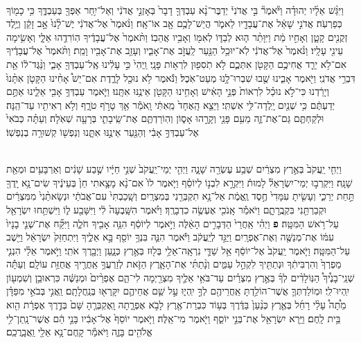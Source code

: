 \documentclass[twoside, openany, parskip=half, 11pt]{book}
\begin{document}
\begin{footnotesize}
\begin{multicols}{2}
\\
 וַיִּגַּ֨שׁ אֵלָ֜יו יְהוּדָ֗ה וַיֹּ֘אמֶר֘ בִּ֣י אֲדֹנִי֒ יְדַבֶּר־נָ֨א עַבְדְּךָ֤ דָבָר֙ בְּאָזְנֵ֣י אֲדֹנִ֔י וְאַל־יִ֥חַר אַפְּךָ֖ בְּעַבְדֶּ֑ךָ כִּ֥י כָמ֖וֹךָ כְּפַרְעֹֽה׃ אֲדֹנִ֣י שָׁאַ֔ל אֶת־עֲבָדָ֖יו לֵאמֹ֑ר הֲיֵשׁ־לָכֶ֥ם אָ֖ב אוֹ־אָֽח׃ וַנֹּ֨אמֶר֙ אֶל־אֲדֹנִ֔י יֶשׁ־לָ֨נוּ֙ אָ֣ב זָקֵ֔ן וְיֶ֥לֶד זְקֻנִ֖ים קָטָ֑ן וְאָחִ֣יו מֵ֔ת וַיִּוָּתֵ֨ר ה֧וּא לְבַדּ֛וֹ לְאִמּ֖וֹ וְאָבִ֥יו אֲהֵבֽוֹ׃  וַתֹּ֨אמֶר֙ אֶל־עֲבָדֶ֔יךָ הֽוֹרִדֻ֖הוּ אֵלָ֑י וְאָשִׂ֥ימָה עֵינִ֖י עָלָֽיו׃ וַנֹּ֨אמֶר֙ אֶל־אֲדֹנִ֔י לֹֽא־יוּכַ֥ל הַנַּ֖עַר לַֽעֲזֹ֣ב אֶת־אָבִ֑יו וְעָזַ֥ב אֶת־אָבִ֖יו וָמֵֽת׃ וַתֹּ֨אמֶר֙ אֶל־עֲבָדֶ֔יךָ אִם־לֹ֥א יֵרֵ֛ד אֲחִיכֶ֥ם הַקָּטֹ֖ן אִתְּכֶ֑ם לֹ֥א תֹֽסִפ֖וּן לִרְא֥וֹת פָּנָֽי׃ וַֽיְהִי֙ כִּ֣י עָלִ֔ינוּ אֶֽל־עַבְדְּךָ֖ אָבִ֑י וַנַּ֨גֶּד־ל֔וֹ אֵ֖ת דִּבְרֵ֥י אֲדֹנִֽי׃  וַיֹּ֖אמֶר אָבִ֑ינוּ שֻׁ֖בוּ שִׁבְרוּ־לָ֥נוּ מְעַט־אֹֽכֶל׃ וַנֹּ֕אמֶר לֹ֥א נוּכַ֖ל לָרֶ֑דֶת אִם־יֵשׁ֩ אָחִ֨ינוּ הַקָּטֹ֤ן אִתָּ֨נוּ֙ וְיָרַ֔דְנוּ כִּי־לֹ֣א נוּכַ֗ל לִרְאוֹת֙ פְּנֵ֣י הָאִ֔ישׁ וְאָחִ֥ינוּ הַקָּטֹ֖ן אֵינֶ֥נּוּ אִתָּֽנוּ׃ וַיֹּ֛אמֶר עַבְדְּךָ֥ אָבִ֖י אֵלֵ֑ינוּ אַתֶּ֣ם יְדַעְתֶּ֔ם כִּ֥י שְׁנַ֖יִם יָֽלְדָה־לִּ֥י אִשְׁתִּֽי׃ וַיֵּצֵ֤א הָֽאֶחָד֙ מֵֽאִתִּ֔י וָֽאֹמַ֕ר אַ֖ךְ טָרֹ֣ף טֹרָ֑ף וְלֹ֥א רְאִיתִ֖יו עַד־הֵֽנָּה׃ וּלְקַחְתֶּ֧ם גַּם־אֶת־זֶ֛ה מֵעִ֥ם פָּנַ֖י וְקָרָ֣הוּ אָס֑וֹן וְהֽוֹרַדְתֶּ֧ם אֶת־שֵֽׂיבָתִ֛י בְּרָעָ֖ה שְׁאֹֽלָה׃ וְעַתָּ֗ה כְּבֹאִי֙ אֶל־עַבְדְּךָ֣ אָבִ֔י וְהַנַּ֖עַר אֵינֶ֣נּוּ אִתָּ֑נוּ וְנַפְשׁ֖וֹ קְשׁוּרָ֥ה בְנַפְשֽׁוֹ׃

\\
 וַיְחִ֤י יַֽעֲקֹב֙ בְּאֶ֣רֶץ מִצְרַ֔יִם שְׁבַ֥ע עֶשְׂרֵ֖ה שָׁנָ֑ה וַיְהִ֤י יְמֵי־יַֽעֲקֹב֙ שְׁנֵ֣י חַיָּ֔יו שֶׁ֣בַע שָׁנִ֔ים וְאַרְבָּעִ֥ים וּמְאַ֖ת שָׁנָֽה׃ וַיִּקְרְב֣וּ יְמֵי־יִשְׂרָאֵל֘ לָמוּת֒ וַיִּקְרָ֣א לִבְנ֣וֹ לְיוֹסֵ֗ף וַיֹּ֤אמֶר לוֹ֙ אִם־נָ֨א מָצָ֤אתִי חֵן֙ בְּעֵינֶ֔יךָ שִׂים־נָ֥א יָֽדְךָ֖ תַּ֣חַת יְרֵכִ֑י וְעָשִׂ֤יתָ עִמָּדִי֙ חֶ֣סֶד וֶֽאֱמֶ֔ת אַל־נָ֥א תִקְבְּרֵ֖נִי בְּמִצְרָֽיִם׃ וְשָֽׁכַבְתִּי֙ עִם־אֲבֹתַ֔י וּנְשָׂאתַ֨נִי֙ מִמִּצְרַ֔יִם וּקְבַרְתַּ֖נִי בִּקְבֻֽרָתָ֑ם וַיֹּאמַ֕ר אָֽנֹכִ֖י אֶעְשֶׂ֥ה כִדְבָרֶֽךָ׃ וַיֹּ֗אמֶר הִשָּֽׁבְעָה֙ לִ֔י וַיִּשָּׁבַ֖ע ל֑וֹ וַיִּשְׁתַּ֥חוּ יִשְׂרָאֵ֖ל עַל־רֹ֥אשׁ הַמִּטָּֽה׃	\textbf{פ}
 וַיְהִ֗י אַֽחֲרֵי֙ הַדְּבָרִ֣ים הָאֵ֔לֶּה וַיֹּ֣אמֶר לְיוֹסֵ֔ף הִנֵּ֥ה אָבִ֖יךָ חֹלֶ֑ה וַיִּקַּ֞ח אֶת־שְׁנֵ֤י בָנָיו֙ עִמּ֔וֹ אֶת־מְנַשֶּׁ֖ה וְאֶת־אֶפְרָֽיִם׃ וַיַּגֵּ֣ד לְיַֽעֲקֹ֔ב וַיֹּ֕אמֶר הִנֵּ֛ה בִּנְךָ֥ יוֹסֵ֖ף בָּ֣א אֵלֶ֑יךָ וַיִּתְחַזֵּק֙ יִשְׂרָאֵ֔ל וַיֵּ֖שֶׁב עַל־הַמִּטָּֽה׃ וַיֹּ֤אמֶר יַֽעֲקֹב֙ אֶל־יוֹסֵ֔ף אֵ֥ל שַׁדַּ֛י נִרְאָֽה־אֵלַ֥י בְּל֖וּז בְּאֶ֣רֶץ כְּנָ֑עַן וַיְבָ֖רֶךְ אֹתִֽי׃  וַיֹּ֣אמֶר אֵלַ֗י הִנְנִ֤י מַפְרְךָ֙ וְהִרְבִּיתִ֔ךָ וּנְתַתִּ֖יךָ לִקְהַ֣ל עַמִּ֑ים וְנָ֨תַתִּ֜י אֶת־הָאָ֧רֶץ הַזֹּ֛את לְזַרְעֲךָ֥ אַֽחֲרֶ֖יךָ אֲחֻזַּ֥ת עוֹלָֽם׃ וְעַתָּ֡ה שְׁנֵֽי־בָנֶ֩יךָ֩ הַנּֽוֹלָדִ֨ים לְךָ֜ בְּאֶ֣רֶץ מִצְרַ֗יִם עַד־בֹּאִ֥י אֵלֶ֛יךָ מִצְרַ֖יְמָה לִי־הֵ֑ם אֶפְרַ֨יִם֙ וּמְנַשֶּׁ֔ה כִּרְאוּבֵ֥ן וְשִׁמְע֖וֹן יִֽהְיוּ־לִֽי׃ וּמֽוֹלַדְתְּךָ֛ אֲשֶׁר־הוֹלַ֥דְתָּ אַֽחֲרֵיהֶ֖ם לְךָ֣ יִֽהְי֑וּ עַ֣ל שֵׁ֧ם אֲחֵיהֶ֛ם יִקָּֽרְא֖וּ בְּנַֽחֲלָתָֽם׃ וַֽאֲנִ֣י בְּבֹאִ֣י מִפַּדָּ֗ן מֵ֩תָה֩ עָלַ֨י רָחֵ֜ל בְּאֶ֤רֶץ כְּנַ֨עַן֙ בַּדֶּ֔רֶךְ בְּע֥וֹד כִּבְרַת־אֶ֖רֶץ לָבֹ֣א אֶפְרָ֑תָה וָֽאֶקְבְּרֶ֤הָ שָּׁם֙ בְּדֶ֣רֶךְ אֶפְרָ֔ת הִ֖וא בֵּ֥ית לָֽחֶם׃ וַיַּ֥רְא יִשְׂרָאֵ֖ל אֶת־בְּנֵ֣י יוֹסֵ֑ף וַיֹּ֖אמֶר מִי־אֵֽלֶּה׃ וַיֹּ֤אמֶר יוֹסֵף֙ אֶל־אָבִ֔יו בָּנַ֣י הֵ֔ם אֲשֶׁר־נָֽתַן־לִ֥י אֱלֹהִ֖ים בָּזֶ֑ה וַיֹּאמַ֕ר קָֽחֶם־נָ֥א אֵלַ֖י וַֽאֲבָֽרֲכֵֽם׃


\end{multicols}
\end{footnotesize}
\end{document}
